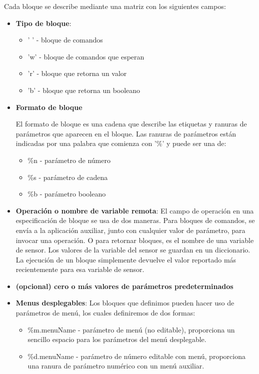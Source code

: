 Cada bloque se describe mediante una matriz con los siguientes campos:
\begin{itemize}
\item \textbf{Tipo de bloque}:
\begin{itemize}
\item ' ' - bloque de comandos
\item 'w' - bloque de comandos que esperan
\item 'r' - bloque que retorna un valor
\item 'b' - bloque que retorna un booleano 
\end{itemize}
\item \textbf{Formato de bloque}

El formato de bloque es una cadena que describe las etiquetas y ranuras de parámetros que aparecen en el bloque.
Las ranuras de parámetros están indicadas por una palabra que comienza con '\%' y puede ser una de:
\begin{itemize}
\item \%n -  parámetro de número 
\item \%s - parámetro de cadena 
\item \%b - parámetro booleano
\end{itemize}
\item \textbf{Operación o nombre de variable remota}:
El campo de operación en una especificación de bloque se usa de dos maneras. Para bloques de comandos, se envía a la aplicación auxiliar, junto con cualquier valor de parámetro, para invocar una operación. O para retornar bloques, es el nombre de una variable de sensor. Los valores de la variable del sensor se guardan en un diccionario.
La ejecución de un bloque simplemente devuelve el valor reportado más recientemente para esa variable de sensor.
\item \textbf{(opcional) cero o más valores de parámetros predeterminados}

\item \textbf{Menus desplegables}:
Los bloques que definimos pueden hacer uso de parámetros de menú, los cuales definiremos de dos formas:
\begin{itemize}
\item \%m.menuName - parámetro de menú (no editable), proporciona un sencillo espacio para los parámetros del menú desplegable.
\item \%d.menuName - parámetro de número editable con menú, proporciona una ranura de parámetro numérico con un menú auxiliar.
\end{itemize}
\end{itemize}

